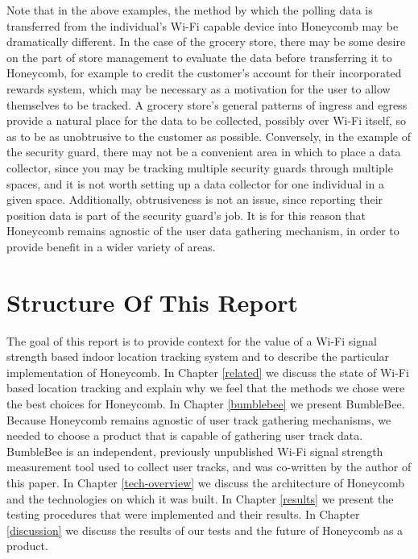 Note that in the above examples, the method by which the polling data is transferred from the individual's Wi-Fi capable device into Honeycomb may be dramatically different. In the case of the grocery store, there may be some desire on the part of store management to evaluate the data before transferring it to Honeycomb, for example to credit the customer's account for their incorporated rewards system, which may be necessary as a motivation for the user to allow themselves to be tracked. A grocery store's general patterns of ingress and egress provide a natural place for the data to be collected, possibly over Wi-Fi itself, so as to be as unobtrusive to the customer as possible. Conversely, in the example of the security guard, there may not be a convenient area in which to place a data collector, since you may be tracking multiple security guards through multiple spaces, and it is not worth setting up a data collector for one individual in a given space. Additionally, obtrusiveness is not an issue, since reporting their position data is part of the security guard's  job. It is for this reason that Honeycomb remains agnostic of the user data gathering mechanism, in order to provide benefit in a wider variety of areas.


\section{Structure Of This Report}
%

The goal of this report is to provide context for the value of a Wi-Fi signal strength based indoor location tracking system and to describe the particular implementation of Honeycomb. In Chapter \ref{related} we discuss the state of Wi-Fi based location tracking and explain why we feel that the methods we chose were the best choices for Honeycomb.  In Chapter \ref{bumblebee} we present BumbleBee. Because Honeycomb remains agnostic of user track gathering mechanisms, we needed to choose a product that is capable of gathering user track data. BumbleBee is an independent, previously unpublished Wi-Fi signal strength measurement tool used to collect user tracks, and was co-written by the author of this paper. In Chapter \ref{tech-overview} we discuss the architecture of Honeycomb and the technologies on which it was built. In Chapter \ref{results} we present the testing procedures that were implemented and their results. In Chapter \ref{discussion} we discuss the results of our tests and the future of Honeycomb as a product.